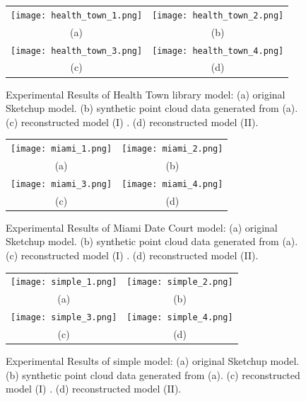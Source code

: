 \begin{figure} [htbp]
\begin{center}
\begin{tabular}{cc}
\texttt{[image: health\_town\_1.png]} &
\texttt{[image: health\_town\_2.png]} \\
(a) & (b) \\
\texttt{[image: health\_town\_3.png]} &
\texttt{[image: health\_town\_4.png]} \\
(c) & (d)
\end{tabular}
\end{center}
\caption{Experimental Results of Health Town library model:
      (a) original Sketchup model.
      (b) synthetic point cloud data generated from (a).
      (c) reconstructed model (I) .
      (d) reconstructed model (II).}
\label{fig:ER_Fig7}
\end{figure}

\begin{figure} [htbp]
\begin{center}
\begin{tabular}{cc}
\texttt{[image: miami\_1.png]} &
\texttt{[image: miami\_2.png]} \\
(a) & (b) \\
\texttt{[image: miami\_3.png]} &
\texttt{[image: miami\_4.png]} \\
(c) & (d)
\end{tabular}
\end{center}
\caption{Experimental Results of Miami Date Court model:
      (a) original Sketchup model.
      (b) synthetic point cloud data generated from (a).
      (c) reconstructed model (I) .
      (d) reconstructed model (II).}
\label{fig:ER_Fig8}
\end{figure}

\begin{figure} [htbp]
\begin{center}
\begin{tabular}{cc}
\texttt{[image: simple\_1.png]} &
\texttt{[image: simple\_2.png]} \\
(a) & (b) \\
\texttt{[image: simple\_3.png]} &
\texttt{[image: simple\_4.png]} \\
(c) & (d)
\end{tabular}
\end{center}
\caption{Experimental Results of simple model:
      (a) original Sketchup model.
      (b) synthetic point cloud data generated from (a).
      (c) reconstructed model (I) .
      (d) reconstructed model (II).}
\label{fig:ER_Fig9}
\end{figure}

